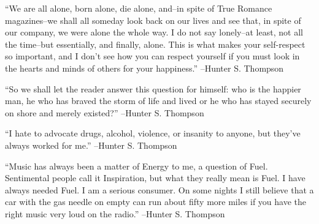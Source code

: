 \documentclass{article}%
\begin{document}
\linebreak%
\vspace{1mm}%
\begin{minipage}{\textwidth}%
\flushleft%
“We are all alone, born alone, die alone, and–in spite of True Romance magazines–we shall all someday look back on our lives and see that, in spite of our company, we were alone the whole way. I do not say lonely–at least, not all the time–but essentially, and finally, alone. This is what makes your self{-}respect so important, and I don't see how you can respect yourself if you must look in the hearts and minds of others for your happiness.”%
\linebreak%
\vspace{1mm}%
–Hunter S. Thompson%
\linebreak%
\vspace{1mm}%
\end{minipage}%
\linebreak%
\vspace{1mm}%
\begin{minipage}{\textwidth}%
\flushleft%
“So we shall let the reader answer this question for himself: who is the happier man, he who has braved the storm of life and lived or he who has stayed securely on shore and merely existed?”%
\linebreak%
\vspace{1mm}%
–Hunter S. Thompson%
\linebreak%
\vspace{1mm}%
\end{minipage}%
\linebreak%
\vspace{1mm}%
\begin{minipage}{\textwidth}%
\flushleft%
“I hate to advocate drugs, alcohol, violence, or insanity to anyone, but they've always worked for me.”%
\linebreak%
\vspace{1mm}%
–Hunter S. Thompson%
\linebreak%
\vspace{1mm}%
\end{minipage}%
\linebreak%
\vspace{1mm}%
\begin{minipage}{\textwidth}%
\flushleft%
“Music has always been a matter of Energy to me, a question of Fuel. Sentimental people call it Inspiration, but what they really mean is Fuel. I have always needed Fuel. I am a serious consumer. On some nights I still believe that a car with the gas needle on empty can run about fifty more miles if you have the right music very loud on the radio.”%
\linebreak%
\vspace{1mm}%
–Hunter S. Thompson%
\linebreak%
\vspace{1mm}%
\end{minipage}%
\end{document}
